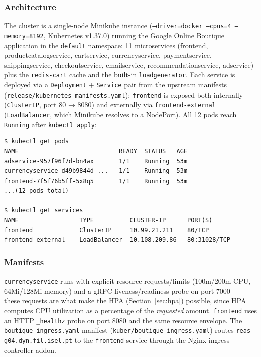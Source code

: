\documentclass[a4paper,11pt]{article}
\begin{document}
\subsubsection{Architecture}

The cluster is a single-node Minikube instance (\texttt{--driver=docker --cpus=4 --memory=8192},
Kubernetes v1.37.0) running the Google Online Boutique application in the \texttt{default}
namespace: 11 microservices (frontend, productcatalogservice, cartservice, currencyservice,
paymentservice, shippingservice, checkoutservice, emailservice, recommendationservice,
adservice) plus the \texttt{redis-cart} cache and the built-in \texttt{loadgenerator}. Each service
is deployed via a \texttt{Deployment} + \texttt{Service} pair from the upstream manifests
(\texttt{release/kubernetes-manifests.yaml}); \texttt{frontend} is exposed both internally
(\texttt{ClusterIP}, port 80 → 8080) and externally via \texttt{frontend-external}
(\texttt{LoadBalancer}, which Minikube resolves to a NodePort). All 12 pods reach \texttt{Running}
after \texttt{kubectl apply}:

\begin{verbatim}
$ kubectl get pods
NAME                            READY  STATUS   AGE
adservice-957f96f7d-bn4wx       1/1    Running  53m
currencyservice-d49b9844d-...   1/1    Running  53m
frontend-7f5f76b5ff-5x8q5       1/1    Running  53m
...(12 pods total)

$ kubectl get services
NAME                 TYPE          CLUSTER-IP      PORT(S)
frontend             ClusterIP     10.99.21.211    80/TCP
frontend-external    LoadBalancer  10.108.209.86   80:31028/TCP
\end{verbatim}

\subsubsection{Manifests}

\texttt{currencyservice} runs with explicit resource requests/limits (100m/200m CPU,
64Mi/128Mi memory) and a gRPC liveness/readiness probe on port 7000 — these requests are what
make the HPA (Section~\ref{sec:hpa}) possible, since HPA computes CPU utilization as a percentage
of the \emph{requested} amount. \texttt{frontend} uses an HTTP \texttt{\_healthz} probe on port
8080 and the same resource envelope. The \texttt{boutique-ingress.yaml} manifest
(\texttt{kuber/boutique-ingress.yaml}) routes \texttt{reas-g04.dyn.fil.isel.pt} to the
\texttt{frontend} service through the Nginx ingress controller addon.
\end{document}
